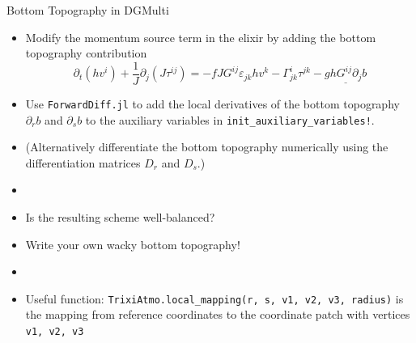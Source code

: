 \documentclass[handout,t,fleqn,leqno,aspectratio=1610,10pt]{beamer}
\begin{document}
\begin{frame}{Bottom Topography in DGMulti}
\begin{itemize}
    \item  Modify the momentum source term in the elixir by adding the bottom topography contribution
    \begin{equation*}
    \partial_t (h v^i) + \frac{1}{J}\partial_j \left(J \tau^{ij}\right) = - f J G^{ij}\varepsilon_{jk} h v^k - \Gamma^i_{jk}\tau^{jk} - \underline{g h G^{ij}\partial_j b}
    \end{equation*}
    \item Use \texttt{ForwardDiff.jl} to add the local derivatives of the bottom topography $\partial_r b$ and $\partial_s b$ to the auxiliary variables in \texttt{init\_auxiliary\_variables!}.
    \item (Alternatively differentiate the bottom topography numerically using the differentiation matrices $D_r$ and $D_s$.)
    \item[]
    \item Is the resulting scheme well-balanced?
    \item Write your own wacky bottom topography!
    \item[]
    \item Useful function: \texttt{TrixiAtmo.local\_mapping(r, s, v1, v2, v3, radius)} is the mapping from reference coordinates to the coordinate patch with vertices \texttt{v1, v2, v3}
\end{itemize}
\end{frame}
\end{document}
